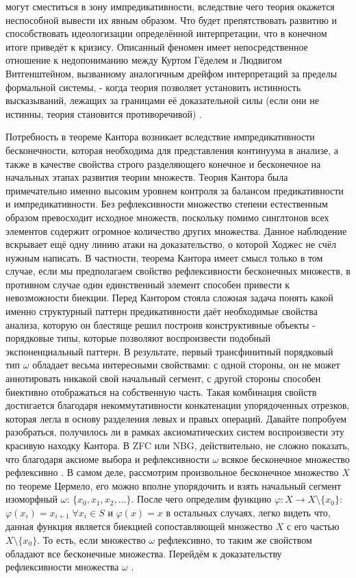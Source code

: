 \documentclass[12pt]{article}
\begin{document}
могут сместиться в зону импредикативности, вследствие чего теория окажется неспособной вывести их явным образом. Что будет препятствовать развитию и способствовать идеологизации определённой интерпретации, что в конечном итоге приведёт к кризису. Описанный феномен имеет непосредственное отношение к недопониманию между Куртом Гёделем и Людвигом Витгенштейном, вызванному аналогичным дрейфом интерпретаций за пределы формальной системы, - когда теория позволяет установить истинность высказываний, лежащих за границами её доказательной силы (если они не истинны, теория становится противоречивой) \cite{wittgenstein-godel}.

Потребность в теореме Кантора возникает вследствие импредикативности бесконечности, которая необходима для представления континуума в анализе, а также в качестве свойства строго разделяющего конечное и бесконечное на начальных этапах развития теории множеств. Теория Кантора была примечательно именно высоким уровнем контроля за балансом предикативности и импредикативности. Без рефлексивности множество степени естественным образом превосходит исходное множеств, поскольку помимо синглтонов всех элементов содержит огромное количество других множества. Данное наблюдение вскрывает ещё одну линию атаки на доказательство, о которой Ходжес не счёл нужным написать. В частности, теорема Кантора имеет смысл только в том случае, если мы предполагаем свойство рефлексивности бесконечных множеств, в противном случае один единственный элемент способен привести к невозможности биекции. Перед Кантором стояла сложная задача понять какой именно структурный паттерн предикативности даёт необходимые свойства анализа, которую он блестяще решил построив конструктивные объекты - порядковые типы, которые позволяют воспроизвести подобный экспоненциальный паттерн. В результате, первый трансфинитный порядковый тип $\omega$ обладает весьма интересными свойствами: с одной стороны, он не может аннотировать никакой свой начальный сегмент, с другой стороны способен биективно отображаться на собственную часть. Такая комбинация свойств достигается благодаря некоммутативности конкатенации упорядоченных отрезков, которая легла в основу разделения левых и правых операций. Давайте попробуем разобраться, получилось ли в рамках аксиоматических систем воспроизвести эту красивую находку Кантора. В ZFC или NBG, действительно, не сложно показать, что благодаря аксиоме выбора и рефлексивности $\omega$ всякое бесконечное множество рефлексивно \cite{fraenkel-reflection-choice}. В самом деле, рассмотрим произвольное бесконечное множество $X$ по теореме Цермело, его можно вполне упорядочить и взять начальный сегмент изоморфный $\omega$: $\{ x_0, x_1, x_2, \dots \}$. После чего определим функцию $\varphi : X \to X \setminus \{ x_0 \}$: $\varphi(x_i) = x_{i + 1} \; \forall x_i \in S$ и $\varphi(x) = x$ в остальных случаях, легко видеть что, данная функция является биекцией сопоставляющей множество $X$ с его частью $X \setminus \{ x_0 \}$. То есть, если множество $\omega$ рефлексивно, то таким же свойством обладают все бесконечные множества. Перейдём к доказательству рефлексивности множества $\omega$ \cite{fraenkel-reflection-omega}.
\end{document}
